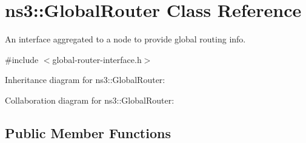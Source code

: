 \hypertarget{classns3_1_1GlobalRouter}{}\section{ns3\+:\+:Global\+Router Class Reference}
\label{classns3_1_1GlobalRouter}


An interface aggregated to a node to provide global routing info.  




{\ttfamily \#include $<$global-\/router-\/interface.\+h$>$}



Inheritance diagram for ns3\+:\+:Global\+Router\+:


Collaboration diagram for ns3\+:\+:Global\+Router\+:
\subsection*{Public Member Functions}
